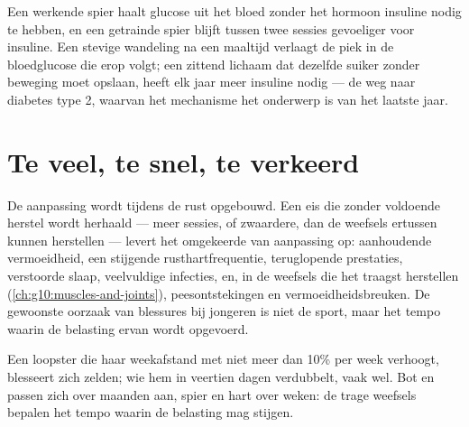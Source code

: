\begin{example}\label{ex:g10:sport-and-health:sugar}
Een werkende spier haalt glucose uit het bloed zonder het hormoon
insuline nodig te hebben, en een getrainde spier blijft tussen twee
sessies gevoeliger voor insuline. Een stevige wandeling na een maaltijd
verlaagt de piek in de bloedglucose die erop volgt; een zittend lichaam
dat dezelfde suiker zonder beweging moet opslaan, heeft elk jaar meer
insuline nodig --- de weg naar diabetes type 2, waarvan het mechanisme
het onderwerp is van het laatste jaar.
\end{example}

\section{Te veel, te snel, te verkeerd}

\begin{proposition}\label{prop:g10:sport-and-health:overtraining}
De aanpassing wordt tijdens de rust opgebouwd. Een eis die zonder
voldoende herstel wordt herhaald --- meer sessies, of zwaardere, dan de
weefsels ertussen kunnen herstellen --- levert het omgekeerde van
aanpassing op: aanhoudende vermoeidheid, een stijgende rusthartfrequentie,
teruglopende prestaties, verstoorde slaap, veelvuldige infecties, en, in
de weefsels die het traagst herstellen
(\cref{ch:g10:muscles-and-joints}), peesontstekingen en
vermoeidheidsbreuken. De gewoonste oorzaak van blessures bij jongeren is
niet de sport, maar het tempo waarin de belasting ervan wordt opgevoerd.
\end{proposition}
\admitted

\begin{example}\label{ex:g10:sport-and-health:tenpercent}
Een loopster die haar weekafstand met niet meer dan 10\% per week
verhoogt, blesseert zich zelden; wie hem in veertien dagen verdubbelt,
vaak wel. Bot en  passen zich over maanden aan, spier en hart over
weken: de trage weefsels bepalen het tempo waarin de belasting mag
stijgen.
\end{example}


